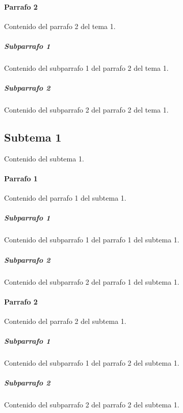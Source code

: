 \documentclass[a4paper,11pt]{article}                 %
\begin{document}
  \paragraph{Parrafo 2}                               %
  Contenido del parrafo 2 del tema 1.
  
  \subparagraph{Subparrafo 1}                         %
  Contenido del subparrafo 1 del parrafo 2 del tema 1.
  
  \subparagraph{Subparrafo 2}                         %
  Contenido del subparrafo 2 del parrafo 2 del tema 1.
    
  \subsection{Subtema 1}                              %
  Contenido del subtema 1.

  \paragraph{Parrafo 1}                               %
  Contenido del parrafo 1 del subtema 1.
  
  \subparagraph{Subparrafo 1}                         %
  Contenido del subparrafo 1 del parrafo 1 del subtema 1.
  
  \subparagraph{Subparrafo 2}                         %
  Contenido del subparrafo 2 del parrafo 1 del subtema 1.

  \paragraph{Parrafo 2}                               %
  Contenido del parrafo 2 del subtema 1.
  
  \subparagraph{Subparrafo 1}                         %
  Contenido del subparrafo 1 del parrafo 2 del subtema 1.
  
  \subparagraph{Subparrafo 2}                         %
  Contenido del subparrafo 2 del parrafo 2 del subtema 1.
  
\end{document}
